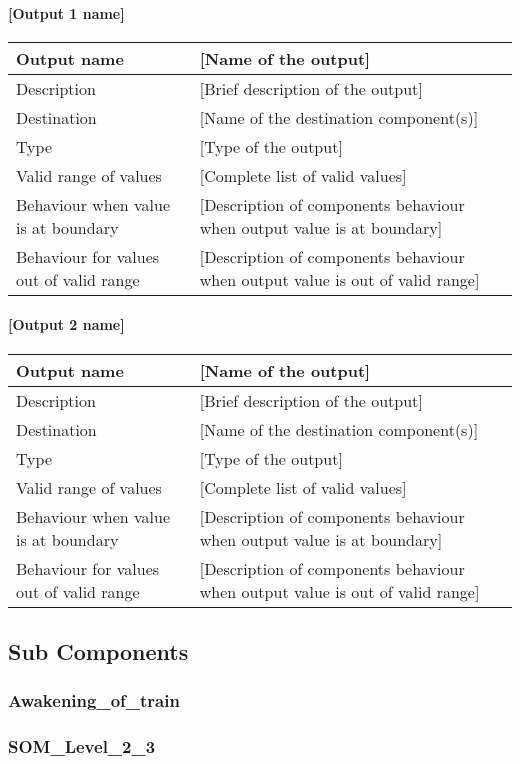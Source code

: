 \paragraph{[Output 1 name]}

\begin{longtable}{p{}p{}}
\toprule
Output name				& [Name of the output] \\
\midrule
Description				& [Brief description of the output] \\
\midrule
Destination				& [Name of the destination component(s)] \\ 
\midrule
Type					& [Type of the output] \\
\midrule
Valid range of values	& [Complete list of valid values] \\
\midrule
Behaviour when value is at boundary	& [Description of components behaviour when output value is at boundary] \\
\midrule
Behaviour for values out of valid range	& [Description of components behaviour when output value is out of valid range] \\
\bottomrule
\end{longtable}


\paragraph{[Output 2 name]}

\begin{longtable}{p{}p{}}
\toprule
Output name				& [Name of the output] \\
\midrule
Description				& [Brief description of the output] \\
\midrule
Destination				& [Name of the destination component(s)] \\ 
\midrule
Type					& [Type of the output] \\
\midrule
Valid range of values	& [Complete list of valid values] \\
\midrule
Behaviour when value is at boundary	& [Description of components behaviour when output value is at boundary] \\
\midrule
Behaviour for values out of valid range	& [Description of components behaviour when output value is out of valid range] \\
\bottomrule
\end{longtable}


\subsection{Sub Components}

\subsubsection{Awakening\_of\_train}


\subsubsection{SOM\_Level\_2\_3}



